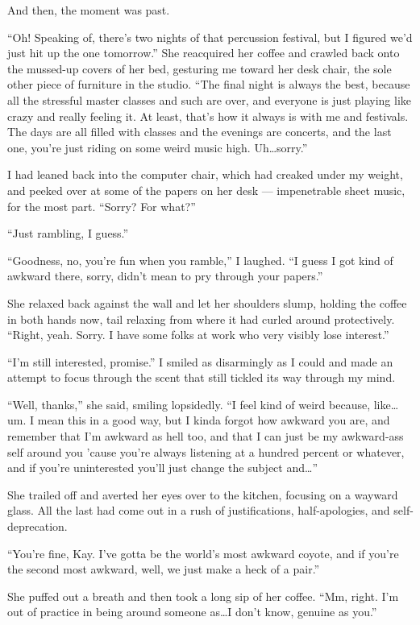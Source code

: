And then, the moment was past.

``Oh! Speaking of, there's two nights of that percussion festival, but I figured we'd just hit up the one tomorrow.'' She reacquired her coffee and crawled back onto the mussed-up covers of her bed, gesturing me toward her desk chair, the sole other piece of furniture in the studio. ``The final night is always the best, because all the stressful master classes and such are over, and everyone is just playing like crazy and really feeling it. At least, that's how it always is with me and festivals. The days are all filled with classes and the evenings are concerts, and the last one, you're just riding on some weird music high. Uh\ldots sorry.''

I had leaned back into the computer chair, which had creaked under my weight, and peeked over at some of the papers on her desk --- impenetrable sheet music, for the most part. ``Sorry? For what?''

``Just rambling, I guess.''

``Goodness, no, you're fun when you ramble,'' I laughed. ``I guess I got kind of awkward there, sorry, didn't mean to pry through your papers.''

She relaxed back against the wall and let her shoulders slump, holding the coffee in both hands now, tail relaxing from where it had curled around protectively. ``Right, yeah. Sorry. I have some folks at work who very visibly lose interest.''

``I'm still interested, promise.'' I smiled as disarmingly as I could and made an attempt to focus through the scent that still tickled its way through my mind.

``Well, thanks,'' she said, smiling lopsidedly. ``I feel kind of weird because, like\ldots um. I mean this in a good way, but I kinda forgot how awkward you are, and remember that I'm awkward as hell too, and that I can just be my awkward-ass self around you 'cause you're always listening at a hundred percent or whatever, and if you're uninterested you'll just change the subject and\ldots{}''

She trailed off and averted her eyes over to the kitchen, focusing on a wayward glass. All the last had come out in a rush of justifications, half-apologies, and self-deprecation.

``You're fine, Kay. I've gotta be the world's most awkward coyote, and if you're the second most awkward, well, we just make a heck of a pair.''

She puffed out a breath and then took a long sip of her coffee. ``Mm, right. I'm out of practice in being around someone as\ldots I don't know, genuine as you.''


